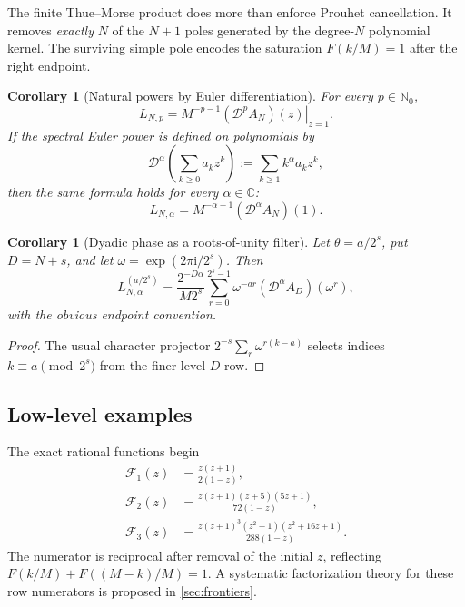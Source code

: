\documentclass[11pt,oneside]{article}
\numberwithin{equation}{section}
\newtheorem{corollary}[theorem]{Corollary}
\theoremstyle{definition}
\theoremstyle{remark}
\newcommand{\C}{\mathbb C}
\newcommand{\N}{\mathbb N}
\newcommand{\ii}{\mathrm i}
\newcommand{\Dop}{\mathcal D}
\newcommand{\Frow}{\mathscr F}
\begin{document}
\begin{resultbox}
The finite Thue--Morse product does more than enforce Prouhet cancellation.  It removes
\emph{exactly} \(N\) of the \(N+1\) poles generated by the degree-\(N\) polynomial
kernel.  The surviving simple pole encodes the saturation \(F(k/M)=1\) after the right
endpoint.
\end{resultbox}

\begin{corollary}[Natural powers by Euler differentiation]
\label{cor:euler-natural}
For every \(p\in\N_0\),
\begin{equation}
 \boxed{\displaystyle
 L_{N,p}=M^{-p-1}\left.(\Dop^pA_N)(z)\right|_{z=1}.}
 \label{eq:euler-natural}
\end{equation}
If the spectral Euler power is defined on polynomials by
\begin{equation}
 \Dop^\alpha\!\left(\sum_{k\ge0}a_kz^k\right)
 :=\sum_{k\ge1}k^\alpha a_kz^k,
 \label{eq:fractional-Euler}
\end{equation}
then the same formula holds for every \(\alpha\in\C\):
\begin{equation}
 L_{N,\alpha}=M^{-\alpha-1}(\Dop^\alpha A_N)(1).
 \label{eq:euler-complex}
\end{equation}
\end{corollary}

\begin{corollary}[Dyadic phase as a roots-of-unity filter]
\label{cor:roots-of-unity}
Let \(\theta=a/2^s\), put \(D=N+s\), and let
\(\omega=\exp(2\pi\ii/2^s)\).  Then
\begin{equation}
 \boxed{\displaystyle
 L_{N,\alpha}^{(a/2^s)}
 =\frac{2^{-D\alpha}}{M2^s}
 \sum_{r=0}^{2^s-1}\omega^{-ar}
 (\Dop^\alpha A_D)(\omega^r),}
 \label{eq:root-filter}
\end{equation}
with the obvious endpoint convention.
\end{corollary}

\begin{proof}
The usual character projector
\(2^{-s}\sum_r\omega^{r(k-a)}\) selects indices \(k\equiv a\pmod{2^s}\) from the
finer level-\(D\) row.
\end{proof}

\subsection{Low-level examples}

The exact rational functions begin
\begin{align}
 \Frow_1(z)&=\frac{z(z+1)}{2(1-z)},
 \label{eq:row-N1}\\
 \Frow_2(z)&=\frac{z(z+1)(z+5)(5z+1)}{72(1-z)},
 \label{eq:row-N2}\\
 \Frow_3(z)&=\frac{z(z+1)^3(z^2+1)(z^2+16z+1)}{288(1-z)}.
 \label{eq:row-N3}
\end{align}
The numerator is reciprocal after removal of the initial \(z\), reflecting
\(F(k/M)+F((M-k)/M)=1\).  A systematic factorization theory for these row numerators is
proposed in \cref{sec:frontiers}.
\end{document}
